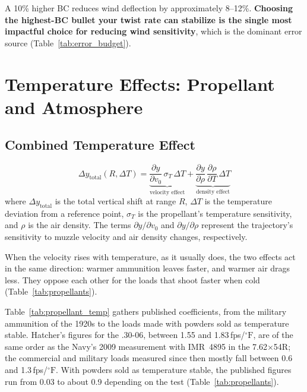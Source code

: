\documentclass[11pt,twoside,openright]{report}
\newcommand{\degF}{\ensuremath{{}^{\circ}\mathrm{F}}}
\begin{document}
A 10\% higher BC reduces wind deflection by approximately 8--12\%. \textbf{Choosing the highest-BC bullet your twist rate can stabilize is the single most impactful choice for reducing wind sensitivity}, which is the dominant error source (Table~\ref{tab:error_budget}).

\section{Temperature Effects: Propellant and Atmosphere}
\label{sec:propellant_temp}

\subsection{Combined Temperature Effect}

\begin{equation}
  \boxed{\Delta y_{\mathrm{total}}(R,\Delta T) = \underbrace{\frac{\partial y}{\partial v_0}\,\sigma_T\,\Delta T}_{\text{velocity effect}} + \underbrace{\frac{\partial y}{\partial \rho}\,\frac{\partial \rho}{\partial T}\,\Delta T}_{\text{density effect}}}
  \label{eq:total_temp_shift}
\end{equation}
where $\Delta y_{\mathrm{total}}$ is the total vertical shift at range $R$, $\Delta T$ is the temperature deviation from a reference point, $\sigma_T$ is the propellant's temperature sensitivity, and $\rho$ is the air density. The terms $\partial y/\partial v_0$ and $\partial y/\partial \rho$ represent the trajectory's sensitivity to muzzle velocity and air density changes, respectively.

When the velocity rises with temperature, as it usually does, the two effects act in the same direction: warmer ammunition leaves faster, and warmer air drags less. They oppose each other for the loads that shoot faster when cold (Table~\ref{tab:propellants}).

Table~\ref{tab:propellant_temp} gathers published coefficients, from the military ammunition of the 1920s to the loads made with powders sold as temperature stable. Hatcher's figures for the .30-06, between 1.55 and 1.83\,fps/$\degF$, are of the same order as the Navy's 2009 measurement with IMR~4895 in the 7.62$\times$54R; the commercial and military loads measured since then mostly fall between 0.6 and 1.3\,fps/$\degF$. With powders sold as temperature stable, the published figures run from 0.03 to about 0.9 depending on the test (Table~\ref{tab:propellants}).
\end{document}
